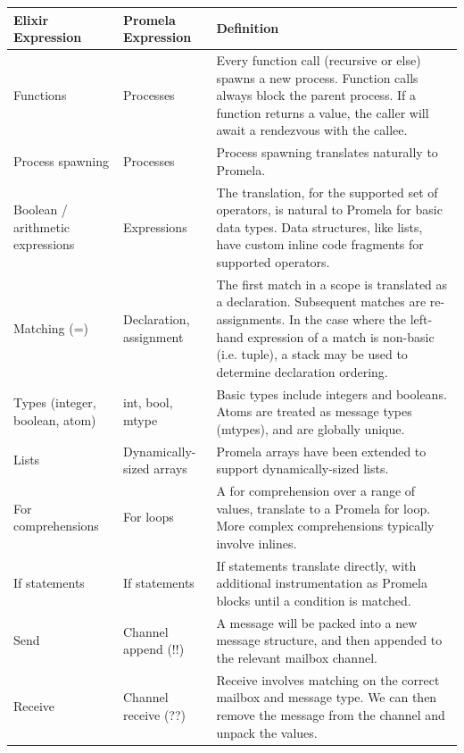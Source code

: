 \begin{longtable}{|>{\raggedright\arraybackslash}p{4cm}|>{\raggedright\arraybackslash}p{4cm}|>{\raggedright\arraybackslash}p{6cm}|}
    \hline
        \textbf{Elixir Expression} & \textbf{Promela Expression} & \textbf{Definition} \\
        \hline
        Functions & Processes & Every function call (recursive or else) spawns a new process. Function calls always block the parent process. If a function returns a value, the caller will await a rendezvous with the callee. \\
        \hline
        Process spawning & Processes & Process spawning translates naturally to Promela. \\
        \hline
        Boolean / arithmetic expressions & Expressions & The translation, for the supported set of operators, is natural to Promela for basic data types. Data structures, like lists, have custom inline code fragments for supported operators. \\
        \hline
        Matching (=) & Declaration, assignment & The first match in a scope is translated as a declaration. Subsequent matches are re-assignments. In the case where the left-hand expression of a match is non-basic (i.e. tuple), a stack may be used to determine declaration ordering. \\
        \hline
        Types (integer, boolean, atom) & int, bool, mtype & Basic types include integers and booleans. Atoms are treated as message types (mtypes), and are globally unique. \\
        \hline
        Lists & Dynamically-sized arrays & Promela arrays have been extended to support dynamically-sized lists. \\
        \hline
        For comprehensions & For loops &  A for comprehension over a range of values, translate to a Promela for loop. More complex comprehensions typically involve inlines. \\
        \hline
        If statements & If statements & If statements translate directly, with additional instrumentation as Promela blocks until a condition is matched. \\
        \hline
        Send & Channel append (!!) & A message will be packed into a new message structure, and then appended to the relevant mailbox channel. \\
        \hline
        Receive & Channel receive (??) & Receive involves matching on the correct mailbox and message type. We can then remove the message from the channel and unpack the values. \\

\end{longtable}
